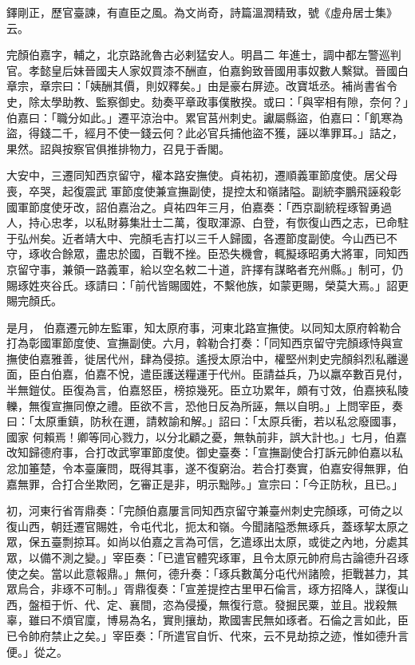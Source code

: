 \begin{pinyinscope}
 鐸剛正，歷官臺諫，有直臣之風。為文尚奇，詩篇溫潤精致，號《虛舟居士集》云。



 完顏伯嘉字，輔之，北京路訛魯古必剌猛安人。明昌二
 年進士，調中都左警巡判官。孝懿皇后妹晉國夫人家奴買漆不酬直，伯嘉鉤致晉國用事奴數人繫獄。晉國白章宗，章宗曰：「姨酬其價，則奴釋矣。」由是豪右屏迹。改寶坻丞。補尚書省令史，除太學助教、監察御史。劾奏平章政事僕散揆。或曰：「與宰相有隙，奈何？」伯嘉曰：「職分如此。」遷平涼治中。累官莒州刺史。讞屬縣盜，伯嘉曰：「飢寒為盜，得錢二千，經月不使一錢云何？此必官兵捕他盜不獲，誣以準罪耳。」詰之，果然。詔與按察官俱推排物力，召見于香閣。



 大安中，三遷同知西京留守，權本路安撫使。貞祐初，遷順義軍節度使。居父母喪，卒哭，起復震武
 軍節度使兼宣撫副使，提控太和嶺諸隘。副統李鵬飛誣殺彰國軍節度使牙改，詔伯嘉治之。貞祐四年三月，伯嘉奏：「西京副統程琢智勇過人，持心忠孝，以私財募集壯士二萬，復取渾源、白登，有恢復山西之志，已命駐于弘州矣。近者靖大中、完顏毛吉打以三千人歸國，各遷節度副使。今山西已不守，琢收合餘眾，盡忠於國，百戰不挫。臣恐失機會，輒擬琢昭勇大將軍，同知西京留守事，兼領一路義軍，給以空名敕二十道，許擇有謀略者充州縣。」制可，仍賜琢姓夾谷氏。琢請曰：「前代皆賜國姓，不繫他族，如蒙更賜，榮莫大焉。」詔更賜完顏氏。



 是月，
 伯嘉遷元帥左監軍，知太原府事，河東北路宣撫使。以同知太原府斡勒合打為彰國軍節度使、宣撫副使。六月，斡勒合打奏：「同知西京留守完顏琢恃與宣撫使伯嘉雅善，徙居代州，肆為侵掠。遙授太原治中，權堅州刺史完顏斜烈私離邊面，臣白伯嘉，伯嘉不悅，遣臣護送糧運于代州。臣請益兵，乃以羸卒數百見付，半無鎧仗。臣復為言，伯嘉怒臣，榜掠幾死。臣立功累年，頗有寸效，伯嘉挾私陵轢，無復宣撫同僚之禮。臣欲不言，恐他日反為所誣，無以自明。」上問宰臣，奏曰：「太原重鎮，防秋在邇，請敕諭和解。」詔曰：「太原兵衝，若以私忿廢國事，國家
 何賴焉！卿等同心戮力，以分北顧之憂，無執前非，誤大計也。」七月，伯嘉改知歸德府事，合打改武寧軍節度使。御史臺奏：「宣撫副使合打訴元帥伯嘉以私忿加箠楚，令本臺廉問，既得其事，遂不復窮治。若合打奏實，伯嘉安得無罪，伯嘉無罪，合打合坐欺罔，乞審正是非，明示黜陟。」宣宗曰：「今正防秋，且已。」



 初，河東行省胥鼎奏：「完顏伯嘉屢言同知西京留守兼臺州刺史完顏琢，可倚之以復山西，朝廷遷官賜姓，令屯代北，扼太和嶺。今聞諸隘悉無琢兵，蓋琢挈太原之眾，保五臺剽掠耳。如尚以伯嘉之言為可信，乞遣琢出太原，或徙之內地，分處其
 眾，以備不測之變。」宰臣奏：「已遣官體究琢軍，且令太原元帥府烏古論德升召琢使之矣。當以此意報鼎。」無何，德升奏：「琢兵數萬分屯代州諸險，拒戰甚力，其眾烏合，非琢不可制。」胥鼎復奏：「宣差提控古里甲石倫言，琢方招降人，謀復山西，盤桓于忻、代、定、襄間，恣為侵擾，無復行意。發掘民粟，並且。戕殺無辜，雖曰不煩官廩，博易為名，實則攘劫，欺國害民無如琢者。石倫之言如此，臣已令帥府禁止之矣。」宰臣奏：「所遣官自忻、代來，云不見劫掠之迹，惟如德升言便。」從之。




\end{pinyinscope}
